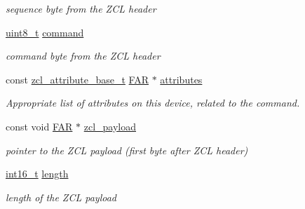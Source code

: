\begin{DoxyCompactItemize}
\begin{DoxyCompactList}\small\item\em sequence byte from the Z\-C\-L header \end{DoxyCompactList}\item 
\hypertarget{group__zcl_ga1a5aaa930940857f68f245eeb89506b5}{\hyperlink{group__hal_gae1affc9ca37cfb624959c866a73f83c2}{uint8\-\_\-t} \hyperlink{group__zcl_ga1a5aaa930940857f68f245eeb89506b5}{command}}\label{group__zcl_ga1a5aaa930940857f68f245eeb89506b5}

\begin{DoxyCompactList}\small\item\em command byte from the Z\-C\-L header \end{DoxyCompactList}\item 
const \hyperlink{structzcl__attribute__base__t}{zcl\-\_\-attribute\-\_\-base\-\_\-t} \hyperlink{group__hal_gaef060b3456fdcc093a7210a762d5f2ed}{F\-A\-R} $\ast$ \hyperlink{group__zcl_ga04c31df34f50e8dd1efaf1105631b2bc}{attributes}
\begin{DoxyCompactList}\small\item\em Appropriate list of attributes on this device, related to the command. \end{DoxyCompactList}\item 
\hypertarget{group__zcl_gaf0e34793a3febabcdb61c020aecbf805}{const void \hyperlink{group__hal_gaef060b3456fdcc093a7210a762d5f2ed}{F\-A\-R} $\ast$ \hyperlink{group__zcl_gaf0e34793a3febabcdb61c020aecbf805}{zcl\-\_\-payload}}\label{group__zcl_gaf0e34793a3febabcdb61c020aecbf805}

\begin{DoxyCompactList}\small\item\em pointer to the Z\-C\-L payload (first byte after Z\-C\-L header) \end{DoxyCompactList}\item 
\hypertarget{group__zcl_ga0ff9f63e333676ba1359f505d02dd281}{\hyperlink{group__hal_ga2140805d08462d474b82ddc8d1c2f3e6}{int16\-\_\-t} \hyperlink{group__zcl_ga0ff9f63e333676ba1359f505d02dd281}{length}}\label{group__zcl_ga0ff9f63e333676ba1359f505d02dd281}

\begin{DoxyCompactList}\small\item\em length of the Z\-C\-L payload \end{DoxyCompactList}\end{DoxyCompactItemize}
\label{_amgrp01747264fe7bf50731df0522c351974e}%
